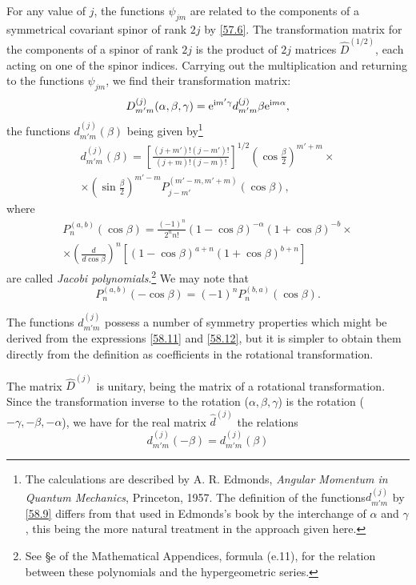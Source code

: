 For any value of $ j $, the functions $\psi_{jm}$ are related to the components of a symmetrical covariant spinor of rank $ 2j $ by \eqref{57.6}. The transformation matrix for the components of a spinor of rank $ 2j $ is the product of $ 2j $ matrices $ \hat{D}^{(1/2)} $, each acting on one of the spinor indices. Carrying out the multiplication and returning to the functions $\psi_{jm}$, we find their transformation matrix:
\begin{equation}\label{58.9}
D^{(j)}_{m'm}(\alpha,\beta,\gamma)=\mathrm{e}^{\mathrm{i} m'\gamma}d_{m'm}^{(j)}\beta\mathrm{e}^{\mathrm{i} m\alpha},
\end{equation}
the functions $ d_{m'm}^{(j)} (\beta) $ being given by\footnote{The calculations are described by A. R. Edmonds, \textit{Angular Momentum in Quantum Mechanics}, Princeton, 1957. The definition of the functions$ d_{m'm}^{(j)}$ by \eqref{58.9} differs from that used in Edmonds’s book by the interchange of $\alpha$ and $\gamma$, this being the more natural treatment in the approach given here.
}
\begin{multline}\label{58.10}
d_{m'm}^{(j)}(\beta)=\left[\frac{(j+m')!(j-m')!}{(j+m)!(j-m)!} \right]^{1/2}\left(\cos\frac{\beta}{2} \right)^{m'+m}\times\\
\times\left(\sin\frac{\beta}{2} \right)^{m'-m}P_{j-m'}^{(m'-m,m'+m)}(\cos\beta),
\end{multline}
where
\begin{multline}\label{58.11}
P_n^{(a,b)}(\cos\beta)=\frac{(-1)^n}{2^nn!}(1-\cos\beta)^{-\alpha}(1+\cos\beta)^{-b}\times\\
\times\left(\frac{d}{d\cos\beta} \right)^n\left[(1-\cos\beta)^{a+n}(1+\cos\beta)^{b+n} \right]
\end{multline}
are called \textit{Jacobi polynomials}.\footnote{See \S e of the Mathematical Appendices, formula (e.11), for the relation between these polynomials and the hypergeometric series.
} We may note that
\begin{equation}\label{58.12}
P_n^{(a,b)}(-\cos\beta)=(-1)^nP_n^{(b,a)}(\cos\beta).
\end{equation}


The functions $ d_{m'm}^{(j)} $ possess a number of symmetry properties which might be derived from the expressions \eqref{58.11} and \eqref{58.12}, but it is simpler to obtain them directly from the definition as coefficients in the rotational transformation.

The matrix $ \hat{D}^{(j)} $ is unitary, being the matrix of a rotational transformation. Since the transformation inverse to the rotation ($ \alpha,\beta,\gamma $) is the rotation ($ -\gamma,-\beta,-\alpha $), we have for the real matrix $ \hat{d}^{(j)} $ the relations
\begin{equation}\label{58.13}
d_{m'm}^{(j)}(-\beta)=d_{m'm}^{(j)}(\beta)
\end{equation}



